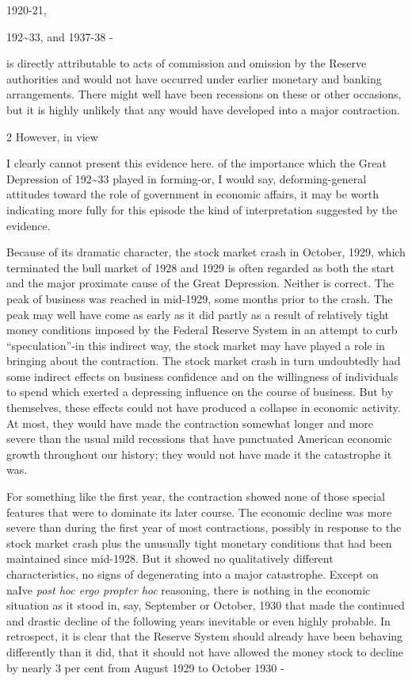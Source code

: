 \documentclass[11pt,openany]{book}
\begin{document}
1920-21,

192\textasciitilde{}33, and 1937-38 -

is directly attributable to acts of commission and omission by the Reserve authorities and would not have occurred under earlier monetary and banking arrangements. There might well have been recessions on these or other occasions, but it is highly unlikely that any would have developed into a major contraction.

2 However, in view

I clearly cannot present this evidence here. of the importance which the Great Depression of 192\textasciitilde{}33 played in forming-or, I would say, deforming-general attitudes toward the role of government in economic affairs, it may be worth indicating more fully for this episode the kind of interpretation suggested by the evidence.

Because of its dramatic character, the stock market crash in October, 1929, which terminated the bull market of 1928 and 1929 is often regarded as both the start and the major proximate cause of the Great Depression. Neither is correct. The peak of business was reached in mid-1929, some months prior to the crash. The peak may well have come as early as it did partly as a result of relatively tight money conditions imposed by the Federal Reserve System in an attempt to curb ``speculation''-in this indirect way, the stock market may have played a role in bringing about the contraction. The stock market crash in turn undoubtedly had some indirect effects on business confidence and on the willingness of individuals to spend which exerted a depressing influence on the course of business. But by themselves, these effects could not have produced a collapse in economic activity. At most, they would have made the contraction somewhat longer and more severe than the usual mild recessions that have punctuated American economic growth throughout our history; they would not have made it the catastrophe it was.

For something like the first year, the contraction showed none of those special features that were to dominate its later course. The economic decline was more severe than during the first year of most contractions, possibly in response to the stock market crash plus the unusually tight monetary conditions that had been maintained since mid-1928. But it showed no qualitatively different characteristics, no signs of degenerating into a major catastrophe. Except on naIve \emph{post hoc ergo propter hoc} reasoning, there is nothing in the economic situation as it stood in, say, September or October, 1930 that made the continued and drastic decline of the following years inevitable or even highly probable. In retrospect, it is clear that the Reserve System should already have been behaving differently than it did, that it should not have allowed the money stock to decline by nearly 3 per cent from August 1929 to October 1930 -
\end{document}
